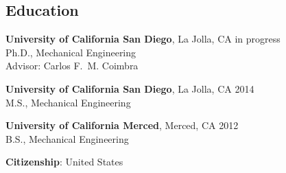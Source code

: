 \documentclass[10pt]{res}
\begin{document}
\address{University of California San Diego \\ 9500 Gilman Drive \#0411 \\ La Jolla, CA 92093--0411}
\address{%
    \hfill \href{mailto:dplarson@ucsd.edu}{dplarson@ucsd.edu} \\
    \hfill \url{http://ieng6.ucsd.edu/~dplarson} \\
    \hfill \url{http://github.com/dplarson}
}


\begin{resume}


\section{Education}
\vspace{0.1in}

\textbf{University of California San Diego}, La Jolla, CA \hfill in progress \\
Ph.D., Mechanical Engineering \\
Advisor: Carlos F.~M. Coimbra \\

\vspace{-0.2in}

\textbf{University of California San Diego}, La Jolla, CA \hfill 2014 \\
M.S., Mechanical Engineering \\

\vspace{-0.2in}

\textbf{University of California Merced}, Merced, CA \hfill 2012 \\
B.S., Mechanical Engineering


\hspace{-0.55in} \textbf{Citizenship}: United States


%



\end{resume}
\end{document}

